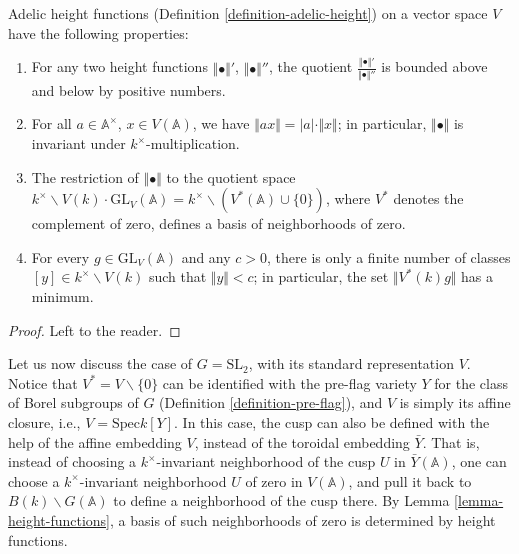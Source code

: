 \begin{lemma}
 \label{lemma-height-functions}
Adelic height functions (Definition \ref{definition-adelic-height}) on a vector space $V$ have the following properties:
\begin{enumerate}
 \item For any two height functions $\Vert \bullet \Vert'$, $\Vert\bullet\Vert''$, the quotient $\frac{\Vert\bullet\Vert'}{\Vert\bullet\Vert''}$ is bounded above and below by positive numbers.
 \item For all $a\in \mathbb A^\times$, $x\in V(\mathbb A)$, we have $\Vert a x \Vert = |a|\cdot \Vert x \Vert$; in particular, $\Vert \bullet \Vert$ is invariant under $k^\times$-multiplication.
 \item The restriction of $\Vert\bullet\Vert$ to the quotient space $k^\times \backslash V(k)\cdot \text{GL}_V(\mathbb A) = k^\times\backslash (V^*(\mathbb A)\cup \{0\})$, where $V^*$ denotes the complement of zero, defines a basis of neighborhoods of zero.
 \item For every $g\in \text{GL}_V(\mathbb A)$ and any $c>0$, there is only a finite number of classes $[y]\in k^\times \backslash V(k)$ such that $\Vert y\Vert <c$; in particular, the set $\Vert V^*(k)g\Vert$ has a minimum.
\end{enumerate}

\end{lemma}

\begin{proof}
 Left to the reader.
\end{proof}


Let us now discuss the case of $G=\text{SL}_2$, with its standard representation $V$. Notice that $V^*=V\smallsetminus\{0\}$ can be identified with the pre-flag variety $Y$ for the class of Borel subgroups of $G$ (Definition \ref{definition-pre-flag}), and $V$ is simply its affine closure, i.e., $V= \text{Spec} k[Y]$. In this case, the cusp can also be defined with the help of the affine embedding $V$, instead of the toroidal embedding $\bar Y$. That is, instead of choosing a $k^\times$-invariant neighborhood of the cusp $U$ in $\bar Y(\mathbb A)$, one can choose a $k^\times$-invariant neighborhood $U$ of zero in $V(\mathbb A)$, and pull it back to $B(k)\backslash G(\mathbb A)$ to define a neighborhood of the cusp there. By Lemma \ref{lemma-height-functions}, a basis of such neighborhoods of zero is determined by height functions.


